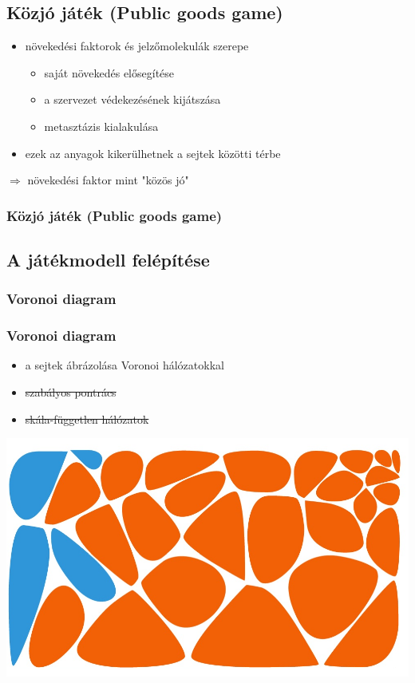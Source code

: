 \subsection{Közjó játék (Public goods game)}
\begin{frame}
\begin{itemize}
	\item növekedési faktorok és jelzőmolekulák szerepe
	\begin{itemize}
		\item saját növekedés elősegítése
		\item a szervezet védekezésének kijátszása
		\item metasztázis kialakulása
	\end{itemize}
	\item ezek az anyagok kikerülhetnek a sejtek közötti térbe
\end{itemize}
\begin{block}
	\centering
	$\Rightarrow$ növekedési faktor mint "közös jó"
\end{block}
\frametitle{Közjó játék (Public goods game)}\end{frame}

\subsection{A játékmodell felépítése}
\subsubsection{Voronoi diagram}
\begin{frame}
	\frametitle{Voronoi diagram}
	\begin{block}{}
		\begin{itemize}
			\item a sejtek ábrázolása Voronoi hálózatokkal
			\item \sout{szabályos pontrács}
			\item \sout{skála-független hálózatok}
		\end{itemize}
	\end{block}
	
	\centering
	\includegraphics[width=0.5\linewidth]{images/Voronoi}
\end{frame}

